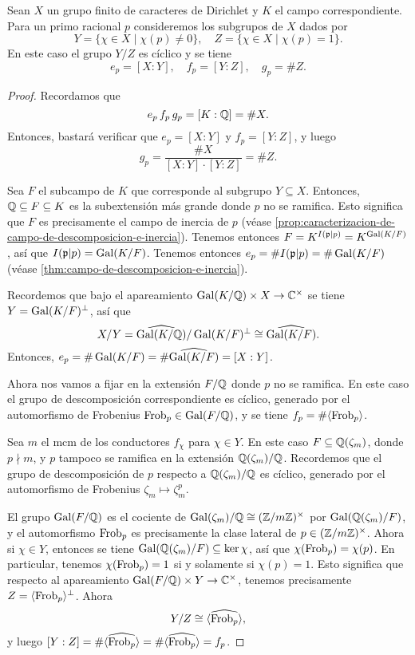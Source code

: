 \begin{teorema}
  \label{thm:caracteres-de-Dirichlet-descomposicion-e-inercia}
  Sean $X$ un grupo finito de caracteres de Dirichlet y $K$ el campo
  correspondiente. Para un primo racional $p$ consideremos los subgrupos de $X$
  dados por
  \[ Y = \{ \chi\in X \mid \chi (p) \ne 0 \}, \quad
     Z = \{ \chi\in X\mid \chi (p) = 1 \}. \]
  En este caso el grupo $Y/Z$ es cíclico y se tiene
  \[ e_p = [X:Y], \quad
     f_p = [Y:Z], \quad
     g_p = \# Z. \]
  \begin{proof}
    Recordamos que
    $$e_p\,f_p\,g_p = [K : \mathbb{Q}] = \# X.$$
    Entonces, bastará verificar que $e_p = [X:Y]$ y $f_p = [Y:Z]$, y luego
    $$g_p = \frac{\# X}{[X:Y]\cdot [Y:Z]} = \# Z.$$

    Sea $F$ el subcampo de $K$ que corresponde al subgrupo
    $Y \subseteq X$. Entonces, $\mathbb{Q} \subseteq F \subseteq K$ es la subextensión
    más grande donde $p$ no se ramifica. Esto significa que $F$ es precisamente
    el campo de inercia de $p$ (véase
    \ref{prop:caracterizacion-de-campo-de-descomposicion-e-inercia}).  Tenemos
    entonces $F = K^{I (\mathfrak{p}|p)} = K^{\operatorname{Gal} (K/F)}$, así que
    $I (\mathfrak{p}|p) = \operatorname{Gal} (K/F)$. Tenemos entonces
    $e_p = \# I (\mathfrak{p}|p) = \# \operatorname{Gal} (K/F)$ (véase
    \ref{thm:campo-de-descomposicion-e-inercia}).

    Recordemos que bajo el apareamiento $\operatorname{Gal} (K/\mathbb{Q}) \times X \to \mathbb{C}^\times$
    se tiene $Y = \operatorname{Gal} (K/F)^\perp$, así que
    \[ X/Y = \widehat{\operatorname{Gal} (K/\mathbb{Q})}/\operatorname{Gal} (K/F)^\perp \cong \widehat{\operatorname{Gal} (K/F)}. \]
    Entonces, $e_p = \# \operatorname{Gal} (K/F) = \# \widehat{\operatorname{Gal} (K/F)} = [X : Y]$.

    Ahora nos vamos a fijar en la extensión $F/\mathbb{Q}$ donde $p$ no se ramifica.
    En este caso el grupo de descomposición correspondiente es cíclico, generado
    por el automorfismo de Frobenius $\operatorname{Frob}_p \in \operatorname{Gal} (F/\mathbb{Q})$, y se tiene
    $f_p = \# \langle \operatorname{Frob}_p\rangle$.

    Sea $m$ el mcm de los conductores $f_\chi$ para $\chi \in Y$. En este caso
    $F \subseteq \mathbb{Q} (\zeta_m)$, donde $p \nmid m$, y $p$ tampoco se ramifica
    en la extensión $\mathbb{Q} (\zeta_m)/\mathbb{Q}$. Recordemos que el grupo de
    descomposición de $p$ respecto a $\mathbb{Q} (\zeta_m)/\mathbb{Q}$ es cíclico, generado
    por el automorfismo de Frobenius $\zeta_m \mapsto \zeta_m^p$.

    El grupo $\operatorname{Gal} (F/\mathbb{Q})$ es el cociente de
    $\operatorname{Gal} (\zeta_m)/\mathbb{Q} \cong (\mathbb{Z}/m\mathbb{Z})^\times$ por $\operatorname{Gal} (\mathbb{Q} (\zeta_m)/F)$,
    y el automorfismo $\operatorname{Frob}_p$ es precisamente la clase lateral de
    $p \in (\mathbb{Z}/m\mathbb{Z})^\times$. Ahora si $\chi \in Y$, entonces se tiene
    $\operatorname{Gal} (\mathbb{Q} (\zeta_m)/F) \subseteq \ker \chi$, así que
    $\chi (\operatorname{Frob}_p) = \chi (p)$. En particular, tenemos
    $\chi (\operatorname{Frob}_p) = 1$ si y solamente si $\chi (p) = 1$. Esto significa
    que respecto al apareamiento $\operatorname{Gal} (F/\mathbb{Q}) \times Y \to \mathbb{C}^\times$,
    tenemos precisamente $Z = \langle \operatorname{Frob}_p\rangle^\perp$. Ahora
    $$Y/Z \cong \widehat{\langle\operatorname{Frob}_p\rangle},$$
    y luego
    $[Y:Z] = \#\widehat{\langle\operatorname{Frob}_p\rangle} = \#\widehat{\langle\operatorname{Frob}_p\rangle} = f_p$.
  \end{proof}
\end{teorema}

